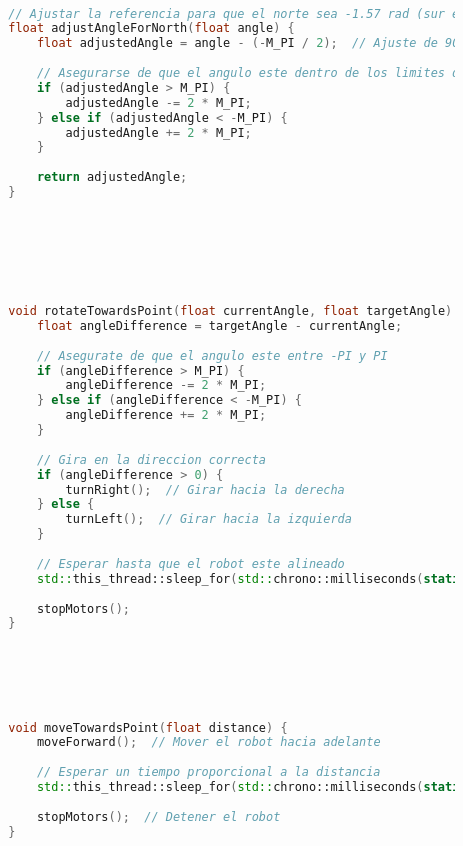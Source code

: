 \begin{lstlisting}[language={C++}, caption={Quinto ajuste de c\'odigo}, label={QuintoAjuste}]
        
        
        
        
        // Ajustar la referencia para que el norte sea -1.57 rad (sur en coordenadas cartesianas es 0 rad)
        float adjustAngleForNorth(float angle) {
            float adjustedAngle = angle - (-M_PI / 2);  // Ajuste de 90 (norte en -90)
            
            // Asegurarse de que el angulo este dentro de los limites de -PI a PI
            if (adjustedAngle > M_PI) {
                adjustedAngle -= 2 * M_PI;
            } else if (adjustedAngle < -M_PI) {
                adjustedAngle += 2 * M_PI;
            }
            
            return adjustedAngle;
        }
        
        
        
        
        
        
        
        void rotateTowardsPoint(float currentAngle, float targetAngle) {
            float angleDifference = targetAngle - currentAngle;
        
            // Asegurate de que el angulo este entre -PI y PI
            if (angleDifference > M_PI) {
                angleDifference -= 2 * M_PI;
            } else if (angleDifference < -M_PI) {
                angleDifference += 2 * M_PI;
            }
        
            // Gira en la direccion correcta
            if (angleDifference > 0) {
                turnRight();  // Girar hacia la derecha
            } else {
                turnLeft();  // Girar hacia la izquierda
            }
        
            // Esperar hasta que el robot este alineado
            std::this_thread::sleep_for(std::chrono::milliseconds(static_cast<int>(std::fabs(angleDifference) * 1000)));
            
            stopMotors();
        }
        
        
        
        
        
        
        void moveTowardsPoint(float distance) {
            moveForward();  // Mover el robot hacia adelante
        
            // Esperar un tiempo proporcional a la distancia
            std::this_thread::sleep_for(std::chrono::milliseconds(static_cast<int>(distance * 1000)));
            
            stopMotors();  // Detener el robot
        }
        

\end{lstlisting}
